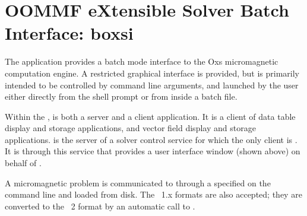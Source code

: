 
\section{OOMMF eXtensible Solver Batch Interface: boxsi}\label{sec:boxsi}%

\begin{center}
\end{center}

The application  provides a batch mode interface to the Oxs
micromagnetic computation engine.  A restricted graphical interface is
provided, but  is primarily intended to be controlled by
command line arguments, and launched by the user either directly from
the shell prompt or from inside a batch file.

Within the ,  is both a server and a client
application. It is a client of data table display and storage
applications, and vector field display and storage applications.
 is the server of a solver control service for which the only
client is .  It is through
this service that  provides a user interface window (shown
above) on behalf of .

A micromagnetic problem is communicated to  through a
 specified on the command line
and loaded from disk.  The \MIF~1.x formats are also accepted; they are
converted to the \MIF~2 format by an automatic call to
.

